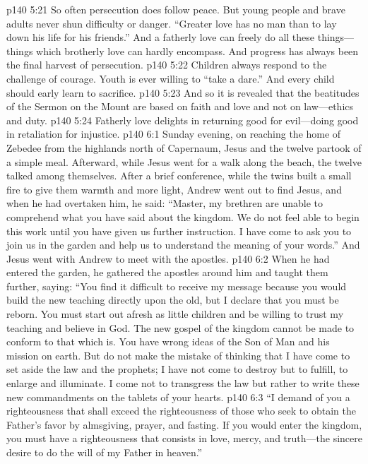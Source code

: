 \vs p140 5:21 So often persecution does follow peace. But young people and brave adults never shun difficulty or danger. \textcolor{ubdarkred}{“Greater love has no man than to lay down his life for his friends.”} And a fatherly love can freely do all these things---things which brotherly love can hardly encompass. And progress has always been the final harvest of persecution.
\vs p140 5:22 Children always respond to the challenge of courage. Youth is ever willing to “take a dare.” And every child should early learn to sacrifice.
\pc \vs p140 5:23 And so it is revealed that the beatitudes of the Sermon on the Mount are based on faith and love and not on law---ethics and duty.
\pc \vs p140 5:24 Fatherly love delights in returning good for evil---doing good in retaliation for injustice.
\vs p140 6:1 Sunday evening, on reaching the home of Zebedee from the highlands north of Capernaum, Jesus and the twelve partook of a simple meal. Afterward, while Jesus went for a walk along the beach, the twelve talked among themselves. After a brief conference, while the twins built a small fire to give them warmth and more light, Andrew went out to find Jesus, and when he had overtaken him, he said: “Master, my brethren are unable to comprehend what you have said about the kingdom. We do not feel able to begin this work until you have given us further instruction. I have come to ask you to join us in the garden and help us to understand the meaning of your words.” And Jesus went with Andrew to meet with the apostles.
\vs p140 6:2 When he had entered the garden, he gathered the apostles around him and taught them further, saying: \textcolor{ubdarkred}{“You find it difficult to receive my message because you would build the new teaching directly upon the old, but I declare that you must be reborn. You must start out afresh as little children and be willing to trust my teaching and believe in God. The new gospel of the kingdom cannot be made to conform to that which is. You have wrong ideas of the Son of Man and his mission on earth. But do not make the mistake of thinking that I have come to set aside the law and the prophets; I have not come to destroy but to fulfill, to enlarge and illuminate. I come not to transgress the law but rather to write these new commandments on the tablets of your hearts.}\plusone
\vs p140 6:3 \textcolor{ubdarkred}{“I demand of you a righteousness that shall exceed the righteousness of those who seek to obtain the Father’s favor by almsgiving, prayer, and fasting. If you would enter the kingdom, you must have a righteousness that consists in love, mercy, and truth---the sincere desire to do the will of my Father in heaven.”}
